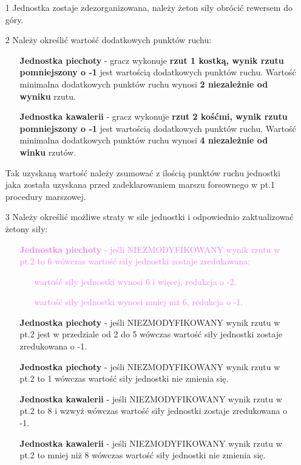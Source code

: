 \begin{itemize}
  \item[1] Jednostka zostaje zdezorganizowana, należy żeton siły obrócić rewersem do góry.
  \item[2] Należy określić wartość dodatkowych punktów ruchu:
        \begin{itemize}
          \item[] \textbf{Jednostka piechoty} - gracz wykonuje \textbf{rzut 1 kostką, wynik rzutu pomniejszony o -1} jest wartością dodatkowych punktów ruchu. Wartość minimalna dodatkowych punktów ruchu wynosi \textbf{2 niezależnie od wyniku} rzutu.
          \item[] \textbf{Jednostka kawalerii} - gracz wykonuje \textbf{rzut 2 kośćmi, wynik rzutu pomniejszony o -1} jest wartością dodatkowych punktów ruchu. Wartość minimalna dodatkowych punktów ruchu  wynosi \textbf{4 niezależnie od winku} rzutów.
        \end{itemize}
        Tak uzyskaną wartość należy zsumować z ilością punktów ruchu jednostki jaka została uzyskana przed zadeklarowaniem marszu forsownego w pt.1 procedury marszowej. 
  \item[3] Należy określić możliwe straty w sile jednostki i odpowiednio zaktualizować żetony siły:
        \begin{itemize}
          \item[] \textcolor{violet}{\textbf{Jednostka piechoty} - jeśli NIEZMODYFIKOWANY wynik rzutu w pt.2 to 6 wówczas wartość siły jednostki zostaje zredukowana:
                  \begin{itemize}
                    \item[] wartość siły jednostki wynosi 6 i więcej, redukcja o -2.
                    \item[] wartość siły jednostki wynosi mniej niż 6, redukcja o -1.
                  \end{itemize}}
          \item[] \textbf{Jednostka piechoty} - jeśli NIEZMODYFIKOWANY wynik rzutu w pt.2 jest w przedziale od 2 do 5 wówczas wartość siły jednostki zostaje zredukowana o -1.
          \item[] \textbf{Jednostka piechoty} - jeśli NIEZMODYFIKOWANY wynik rzutu w pt.2 to 1 wówczas wartość siły jednostki nie zmienia się.
          \item[] \textbf{Jednostka kawalerii} - jeśli NIEZMODYFIKOWANY wynik rzutu w pt.2 to 8 i wzwyż wówczas wartość siły jednostki zostaje zredukowana o -1.
          \item[] \textbf{Jednostka kawalerii} - jeśli NIEZMODYFIKOWANY wynik rzutu w pt.2 to mniej niż 8 wówczas wartość siły jednostki nie zmienia się.
        \end{itemize}
\end{itemize}
